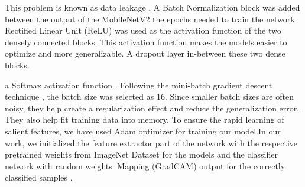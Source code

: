 \documentclass[a4paper,10pt]{article}
\begin{document}
This problem is
known as data leakage \cite{52}.
A Batch Normalization \cite{53} block was added between the output of the MobileNetV2
the epochs needed to train the network. Rectified Linear Unit (ReLU) \cite{54}  was used as the activation function of the two
densely connected blocks. This activation function makes the models easier to optimize and more generalizable. A dropout layer \cite{55} in-between these two dense blocks.

a Softmax activation function \cite{56}.
 Following the mini-batch gradient descent technique \cite{57}, the batch size was selected as 16. Since smaller batch sizes are often noisy, they help create a regularization effect and reduce the generalization error. They also help fit
training data into memory. To ensure the rapid learning of salient features, we have
used Adam optimizer \cite{58} for training our model.In our work, we initialized the feature extractor part of the network with the respective pretrained weights from ImageNet Dataset \cite{59} for the models and the classifier
network with random weights.
Mapping (GradCAM) output for the correctly classified samples \cite{60}.


\end{document}
